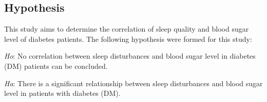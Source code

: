 \subsection*{Hypothesis}
This study aims to determine the correlation of sleep quality and blood sugar
level of diabetes patients. The following hypothesis were formed for this study:
\vspace{0.75em}

\noindent
\textit{Ho}: No correlation between sleep disturbances and blood sugar level in diabetes (DM) patients can be concluded.

\noindent
\textit{Ha}: There is a significant relationship between sleep disturbances and
blood sugar level in patients with diabetes (DM).
